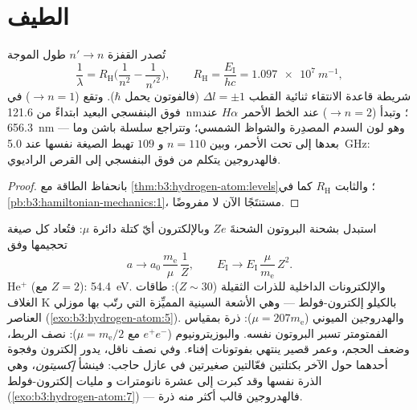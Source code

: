 \section{الطيف}

\begin{proposition}\label{prop:b3:hydrogen-atom:series}
تُصدر القفزة $n' \to n$ طول الموجة
\[
\frac{1}{\lambda} = R_{\text{H}}\Big(\frac{1}{n^2} -
\frac{1}{n'^2}\Big) , \qquad
R_{\text{H}} = \frac{E_{\text{I}}}{hc} = \qty{1.097e7}{m^{-1}} ,
\]
شريطة قاعدة الانتقاء ثنائية القطب $\Delta l = \pm1$ (فالفوتون
يحمل $\hbar$). وتقع  ($\to n = 1$) في فوق البنفسجي
البعيد ابتداءً من \qty{121.6}{nm}؛ وتبدأ  ($\to n = 2$)
عند الخط الأحمر $H\alpha$ عند \qty{656.3}{nm} --- وهو لون
السدم المصدِرة والشواظ الشمسي؛ وتتراجع سلسلة باشن وما بعدها
إلى تحت الأحمر، وبين $n = 110$ و $109$ تهبط الصيغة نفسها
عند \qty{5.0}{GHz}: فالهدروجين يتكلم من
فوق البنفسجي إلى القرص الراديوي.
\end{proposition}

\begin{proof}
بانحفاظ الطاقة مع \cref{thm:b3:hydrogen-atom:levels}؛
والثابت $R_{\text{H}}$ كما في \cref{pb:b3:hamiltonian-mechanics:1}، مستنتَجًا
الآن لا مفروضًا.
\end{proof}

\begin{example}\label{ex:b3:hydrogen-atom:scaling}
استبدل بشحنة البروتون الشحنةَ $Ze$ وبالإلكترون أيّ كتلة
دائرة $\mu$: فتُعاد كل صيغة تحجيمها وفق
\[
a \to a_0\,\frac{m_{\text{e}}}{\mu}\,\frac1Z , \qquad
E_{\text{I}} \to E_{\text{I}}\,\frac{\mu}{m_{\text{e}}}\,Z^2 .
\]
He$^+$ (مع $Z = 2$): \qty{54.4}{eV}. والإلكترونات الداخلية للذرات الثقيلة
($Z \sim 30$): طاقات الغلاف K بالكيلو إلكترون-فولط --- وهي الأشعة السينية
المميِّزة التي رتّب بها موزلي العناصر
(\cref{exo:b3:hydrogen-atom:5}). والهدروجين الميوني ($\mu = 207
m_{\text{e}}$): ذرة بمقياس الفمتومتر تسبر البروتون نفسه.
والبوزيترونيوم ($e^+e^-$ مع $\mu = m_{\text{e}}/2$): نصف الربط،
وضعف الحجم، وعمر قصير ينتهي بفوتونات إفناء.
وفي نصف ناقل، يدور إلكترون وفجوة أحدهما حول الآخر
بكتلتين فعّالتين صغيرتين في عازل حاجب: فينشأ
\emph{إكسيتون}، وهي الذرة نفسها وقد كبرت إلى عشرة نانومترات و
مليات إلكترون-فولط (\cref{exo:b3:hydrogen-atom:7}) --- فالهدروجين
قالب أكثر منه ذرة.
\end{example}


